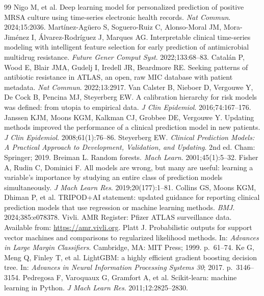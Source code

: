 \documentclass[11pt,a4paper]{article}
\begin{document}
\begin{thebibliography}{99}
 Nigo M, et al. Deep learning model for personalized prediction of positive MRSA culture using time-series electronic health records. \textit{Nat Commun}. 2024;15:2036.
 Mart\'inez-Ag\"uero S, Soguero-Ruiz C, Alonso-Moral JM, Mora-Jim\'enez I, \'Alvarez-Rodr\'iguez J, Marques AG. Interpretable clinical time-series modeling with intelligent feature selection for early prediction of antimicrobial multidrug resistance. \textit{Future Gener Comput Syst}. 2022;133:68--83.
 Catal\'an P, Wood E, Blair JMA, Gudelj I, Iredell JR, Beardmore RE. Seeking patterns of antibiotic resistance in ATLAS, an open, raw MIC database with patient metadata. \textit{Nat Commun}. 2022;13:2917.
 Van Calster B, Nieboer D, Vergouwe Y, De Cock B, Pencina MJ, Steyerberg EW. A calibration hierarchy for risk models was defined: from utopia to empirical data. \textit{J Clin Epidemiol}. 2016;74:167--176.
 Janssen KJM, Moons KGM, Kalkman CJ, Grobbee DE, Vergouwe Y. Updating methods improved the performance of a clinical prediction model in new patients. \textit{J Clin Epidemiol}. 2008;61(1):76--86.
 Steyerberg EW. \textit{Clinical Prediction Models: A Practical Approach to Development, Validation, and Updating}. 2nd ed. Cham: Springer; 2019.
 Breiman L. Random forests. \textit{Mach Learn}. 2001;45(1):5--32.
 Fisher A, Rudin C, Dominici F. All models are wrong, but many are useful: learning a variable's importance by studying an entire class of prediction models simultaneously. \textit{J Mach Learn Res}. 2019;20(177):1--81.
 Collins GS, Moons KGM, Dhiman P, et al. TRIPOD+AI statement: updated guidance for reporting clinical prediction models that use regression or machine learning methods. \textit{BMJ}. 2024;385:e078378.
 Vivli. AMR Register: Pfizer ATLAS surveillance data. Available from: \url{https://amr.vivli.org}.
 Platt J. Probabilistic outputs for support vector machines and comparisons to regularized likelihood methods. In: \textit{Advances in Large Margin Classifiers}. Cambridge, MA: MIT Press; 1999. p.~61--74.
 Ke G, Meng Q, Finley T, et al. LightGBM: a highly efficient gradient boosting decision tree. In: \textit{Advances in Neural Information Processing Systems 30}; 2017. p.~3146--3154.
 Pedregosa F, Varoquaux G, Gramfort A, et al. Scikit-learn: machine learning in Python. \textit{J Mach Learn Res}. 2011;12:2825--2830.

\end{thebibliography}
\end{document}
